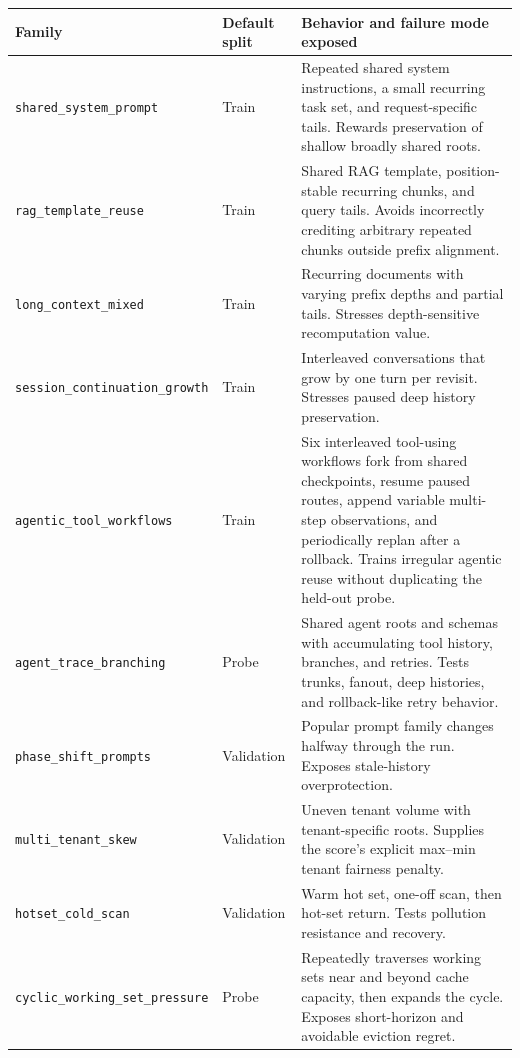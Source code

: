 \documentclass[11pt]{article}
\newcommand{\identifier}[1]{\nolinkurl{#1}}
\begin{document}
\begin{longtable}{>{\raggedright\arraybackslash}p{}
                  >{\raggedright\arraybackslash}p{}
                  >{\raggedright\arraybackslash}p{}}
\toprule
\textbf{Family} & \textbf{Default split} & \textbf{Behavior and failure mode exposed} \\
\midrule
\endhead
\identifier{shared_system_prompt} & Train &
Repeated shared system instructions, a small recurring task set, and request-specific
tails.  Rewards preservation of shallow broadly shared roots. \\
\identifier{rag_template_reuse} & Train &
Shared RAG template, position-stable recurring chunks, and query tails.  Avoids
incorrectly crediting arbitrary repeated chunks outside prefix alignment. \\
\identifier{long_context_mixed} & Train &
Recurring documents with varying prefix depths and partial tails.  Stresses
depth-sensitive recomputation value. \\
\identifier{session_continuation_growth} & Train &
Interleaved conversations that grow by one turn per revisit.  Stresses paused deep
history preservation. \\
\identifier{agentic_tool_workflows} & Train &
Six interleaved tool-using workflows fork from shared checkpoints, resume paused
routes, append variable multi-step observations, and periodically replan after a
rollback.  Trains irregular agentic reuse without duplicating the held-out probe. \\
\midrule
\identifier{agent_trace_branching} & Probe &
Shared agent roots and schemas with accumulating tool history, branches, and retries.
Tests trunks, fanout, deep histories, and rollback-like retry behavior. \\
\identifier{phase_shift_prompts} & Validation &
Popular prompt family changes halfway through the run.  Exposes stale-history
overprotection. \\
\identifier{multi_tenant_skew} & Validation &
Uneven tenant volume with tenant-specific roots.  Supplies the score's explicit
max--min tenant fairness penalty. \\
\identifier{hotset_cold_scan} & Validation &
Warm hot set, one-off scan, then hot-set return.  Tests pollution resistance and
recovery. \\
\identifier{cyclic_working_set_pressure} & Probe &
Repeatedly traverses working sets near and beyond cache capacity, then expands the
cycle.  Exposes short-horizon and avoidable eviction regret. \\

\end{longtable}
\end{document}

